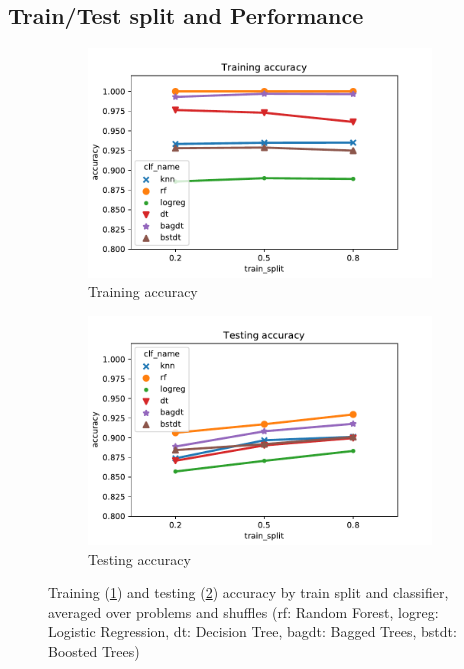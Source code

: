 \documentclass[twoside,11pt]{article}
\begin{document}
		\subsection{Train/Test split and Performance}
			\begin{figure}[h]
				\begin{subfigure}{.5\textwidth}
					\includegraphics[width=\textwidth]{tr_acc_by_clf_trainsplit}
					\caption{Training accuracy}
					\label{fig:perf_by_trainsplit_tr}
				\end{subfigure}
				\begin{subfigure}{.5\textwidth}
					\includegraphics[width=\textwidth]{te_acc_by_clf_trainsplit}
					\caption{Testing accuracy}
					\label{fig:perf_by_trainsplit_te}
				\end{subfigure}
				\caption{Training (\ref{fig:perf_by_trainsplit_tr}) and testing (\ref{fig:perf_by_trainsplit_te}) accuracy by train split and classifier, averaged over problems and shuffles (rf: Random Forest, logreg: Logistic Regression, dt: Decision Tree, bagdt: Bagged Trees, bstdt: Boosted Trees)}
				\label{fig:perf_by_trainsplit}
			\end{figure}
		
\end{document}
